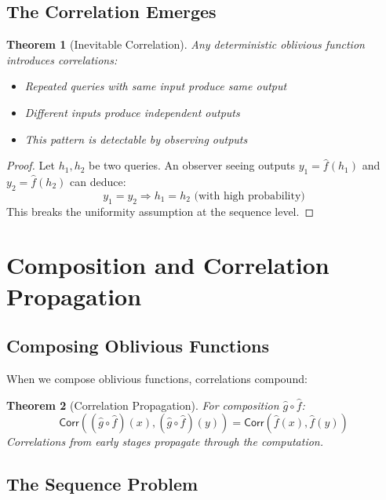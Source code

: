 \documentclass[11pt,final]{article}
\newcommand{\Correlation}{\mathsf{Corr}}
\newtheorem{theorem}{Theorem}[section]
\begin{document}
\subsection{The Correlation Emerges}

\begin{theorem}[Inevitable Correlation]
Any deterministic oblivious function introduces correlations:
\begin{itemize}
    \item Repeated queries with same input produce same output
    \item Different inputs produce independent outputs
    \item This pattern is detectable by observing outputs
\end{itemize}
\end{theorem}

\begin{proof}
Let $h_1, h_2$ be two queries. An observer seeing outputs $y_1 = \hat{f}(h_1)$ and $y_2 = \hat{f}(h_2)$ can deduce:
\begin{equation}
y_1 = y_2 \Rightarrow h_1 = h_2 \text{ (with high probability)}
\end{equation}
This breaks the uniformity assumption at the sequence level.
\end{proof}

\section{Composition and Correlation Propagation}

\subsection{Composing Oblivious Functions}

When we compose oblivious functions, correlations compound:

\begin{theorem}[Correlation Propagation]
For composition $\hat{g} \circ \hat{f}$:
\begin{equation}
\Correlation((\hat{g} \circ \hat{f})(x), (\hat{g} \circ \hat{f})(y)) = \Correlation(\hat{f}(x), \hat{f}(y))
\end{equation}
Correlations from early stages propagate through the computation.
\end{theorem}

\subsection{The Sequence Problem}
\end{document}
